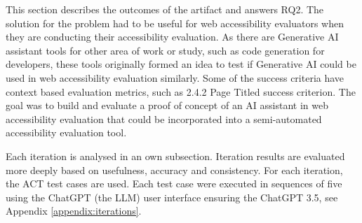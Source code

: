 This section describes the outcomes of the artifact and answers RQ2. The solution for the problem had to be useful for web accessibility evaluators when they are conducting their accessibility evaluation. As there are Generative AI assistant tools for other area of work or study, such as code generation for developers, these tools originally formed an idea to test if Generative AI could be used in web accessibility evaluation similarly. Some of the success criteria have context based evaluation metrics, such as 2.4.2 Page Titled success criterion. The goal was to build and evaluate a proof of concept of an AI assistant in web accessibility evaluation that could be incorporated into a semi-automated accessibility evaluation tool.

Each iteration is analysed in an own subsection. Iteration results are evaluated more deeply based on usefulness, accuracy and consistency. For each iteration, the \textcite{act_rule_g88} ACT test cases are used. Each test case were executed in sequences of five using the ChatGPT (the LLM) user interface ensuring the ChatGPT 3.5, see Appendix \ref{appendix:iterations}. 

